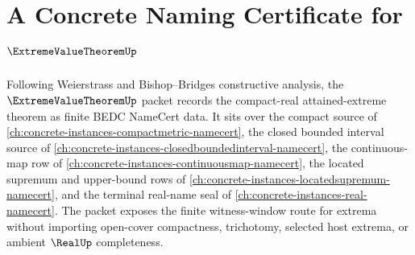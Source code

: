 \chapter{A Concrete Naming Certificate for $\ExtremeValueTheoremUp$}
\label{ch:concrete-instances-extreme-value-theorem-namecert}

Following Weierstrass and Bishop--Bridges constructive analysis, the $\ExtremeValueTheoremUp$ packet records the compact-real attained-extreme theorem as finite BEDC NameCert data. It sits over the compact source of \autoref{ch:concrete-instances-compactmetric-namecert}, the closed bounded interval source of \autoref{ch:concrete-instances-closedboundedinterval-namecert}, the continuous-map row of \autoref{ch:concrete-instances-continuousmap-namecert}, the located supremum and upper-bound rows of \autoref{ch:concrete-instances-locatedsupremum-namecert}, and the terminal real-name seal of \autoref{ch:concrete-instances-real-namecert}. The packet exposes the finite witness-window route for extrema without importing open-cover compactness, trichotomy, selected host extrema, or ambient $\RealUp$ completeness.

